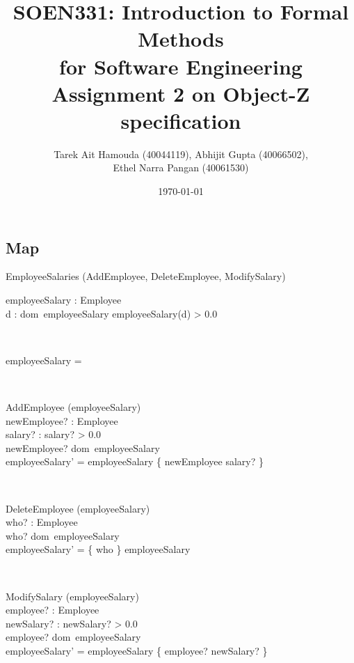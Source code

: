 \documentclass[12pt]{article}
\title{SOEN331: Introduction to Formal Methods\\for Software Engineering\\
Assignment 2 on Object-Z specification}
\author{Tarek Ait Hamouda (40044119), Abhijit Gupta (40066502),\\ 
Ethel Narra Pangan (40061530)}
\date{\today}
\begin{document}
\begin{spacing}{1.5}

\maketitle

\newpage

\section{Map}

\begin{class}{EmployeeSalaries}
\also
\upharpoonright (AddEmployee, DeleteEmployee, ModifySalary) \\
\begin{state}
employeeSalary : Employee \pfun {}\\
\where
\forall d : dom~employeeSalary \bullet employeeSalary(d) > 0.0
\end{state} \\
\begin{init}
employeeSalary = \emptyset %
\end{init} \\
\begin{op}{AddEmployee}
\Delta (employeeSalary) \\
newEmployee? : Employee\\
salary? : 
\ST
salary? > 0.0 \\
newEmployee? \notin dom~employeeSalary\\
employeeSalary' = employeeSalary \cup \{ newEmployee \mapsto salary? \}
\end{op}\\
\begin{op}{DeleteEmployee}
\Delta (employeeSalary) \\
who? : Employee\\
\ST
who? \in dom~employeeSalary\\
employeeSalary' = \{ who \} \ndres employeeSalary
\end{op}\\
\begin{op}{ModifySalary}
\Delta (employeeSalary) \\
employee? : Employee\\
newSalary? : 
\ST
newSalary? > 0.0 \\
employee? \in dom~employeeSalary\\
employeeSalary' = employeeSalary \oplus \{ employee? \mapsto newSalary? \}
\end{op}\\
\end{class}





\end{spacing}
\end{document}
